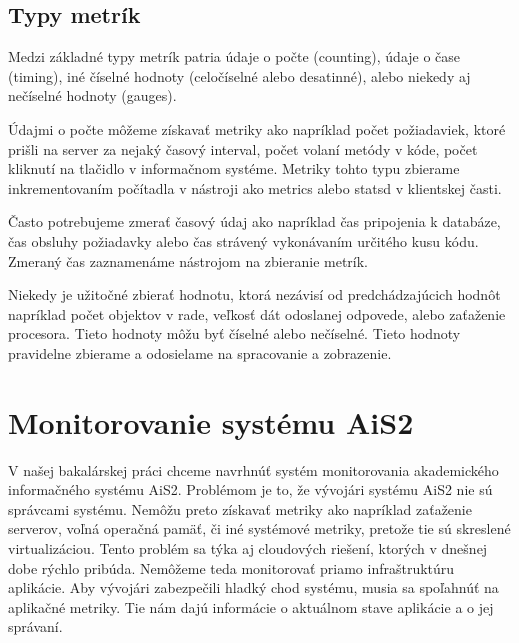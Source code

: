 \documentclass[a4paper, upjsfrontpage, thesismargins, thesislinespacing]{rnthesis}
\begin{document}
\subsection{Typy metrík}

Medzi základné typy metrík patria údaje o počte (counting), údaje o čase (timing), iné číselné hodnoty (celočíselné alebo desatinné), alebo niekedy aj nečíselné hodnoty (gauges). 

Údajmi o počte môžeme získavať metriky ako napríklad počet požiadaviek, ktoré prišli na server za nejaký časový interval, počet volaní metódy v kóde, počet kliknutí na tlačidlo v informačnom systéme. Metriky tohto typu zbierame inkrementovaním počítadla v nástroji ako metrics alebo statsd v klientskej časti.

Často potrebujeme zmerať časový údaj ako napríklad čas pripojenia k databáze, čas obsluhy požiadavky alebo čas strávený vykonávaním určitého kusu kódu. Zmeraný čas zaznamenáme nástrojom na zbieranie metrík.

Niekedy je užitočné zbierať hodnotu, ktorá nezávisí od predchádzajúcich hodnôt napríklad počet objektov v rade, veľkosť dát odoslanej odpovede, alebo zaťaženie procesora. 
Tieto hodnoty môžu byť číselné alebo nečíselné. Tieto hodnoty pravidelne zbierame a odosielame na spracovanie a zobrazenie.

\section{Monitorovanie systému AiS2}

V našej bakalárskej práci chceme navrhnúť systém monitorovania akademického informačného systému AiS2.
Problémom je to, že vývojári systému AiS2 nie sú správcami systému.
Nemôžu preto získavať metriky ako napríklad zaťaženie serverov, voľná operačná pamäť, či iné systémové metriky, pretože tie sú skreslené virtualizáciou.
Tento problém sa týka aj cloudových riešení, ktorých v dnešnej dobe rýchlo pribúda.
Nemôžeme teda monitorovať priamo infraštruktúru aplikácie.
Aby vývojári zabezpečili hladký chod systému, musia sa spoľahnúť na aplikačné metriky.
Tie nám dajú informácie o aktuálnom stave aplikácie a o jej správaní.
\end{document}
